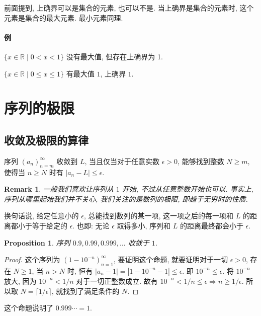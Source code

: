 \documentclass[UTF8]{ctexart}
\theoremstyle{mystyle}
\newtheorem{proposition}{Proposition}[section]
\theoremstyle{myremark}
\newtheorem*{remark}{Remark}
\theoremstyle{plain}
\newcommand{\R}{\mathbb R}
\begin{document}
前面提到, 上确界可以是集合的元素, 也可以不是. 当上确界是集合的元素时, 这个元素是集合的最大元素. 最小元素同理.
\paragraph{例}
$ \{ x \in \R \mid 0 < x < 1 \} $ 没有最大值, 但存在上确界为 1.

$ \{ x \in \R \mid 0 \leqslant x \leqslant 1 \} $ 有最大值 $ 1 $, 上确界 $ 1 $.


\section{序列的极限}
\subsection{收敛及极限的算律}
\begin{definition}[\text{收敛}]
    序列 $ (a_n)_{n = m}^\infty $ 收敛到 $ L $, 当且仅当对于任意实数 $ \epsilon > 0 $, 能够找到整数 $ N \geqslant m $, 使得当 $ n \geqslant N $ 时有 $ |a_n - L| \leqslant \epsilon $.
\end{definition}

\begin{remark}
    一般我们喜欢让序列从 $ 1 $ 开始, 不过从任意整数开始也可以. 事实上, 序列从哪里起始我们并不关心, 我们关注的是数列的极限, 即趋于无穷时的性质.
\end{remark}

换句话说, 给定任意小的 $ \epsilon $, 总能找到数列的某一项, 这一项之后的每一项和 $ L $ 的距离都小于等于给定的 $ \epsilon $. 也即: 无论 $ \epsilon $ 取得多小, 序列和 $ L $ 的距离最终都会小于 $ \epsilon $.

\begin{proposition}
    序列 $ 0.9, 0.99, 0.999, \dots $ 收敛于 $ 1 $.
\end{proposition}

\begin{proof}
    这个序列为 $ (1 - 10^{-n})_{n = 1}^\infty $, 要证明这个命题, 就要证明对于一切 $ \epsilon > 0 $, 存在 $ N \geqslant 1 $, 当 $ n > N $ 时, 恒有 $ |a_n - 1| = |1 - 10^{-n} - 1| \leqslant \epsilon $. 即 $ 10^{-n} \leqslant \epsilon $. 将 $ 10^{-n} $ 放大, 因为 $ 10^{-n} < 1/n $ 对于一切正整数成立. 故有 $ 10^{-n} < 1/n \leqslant \epsilon \Longrightarrow n \geqslant 1/\epsilon $. 所以取 $ N = \lceil 1/\epsilon \rceil $, 就找到了满足条件的 $ N $. 
\end{proof}

这个命题说明了 $ 0.999\cdots = 1 $.
\end{document}
